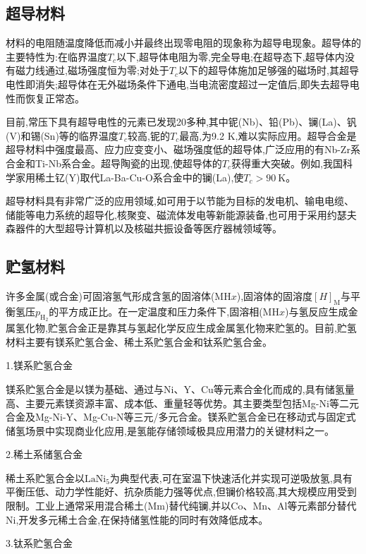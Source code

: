 \documentclass[UTF8]{ctexbook}
\newcommand{\◎}{\ensuremath{\bigcirc}}
\begin{document}
\subsection{超导材料}

材料的电阻随温度降低而减小并最终出现零电阻的现象称为超导电现象。超导体的主要特性为:在临界温度$T_c$以下,超导体电阻为零,完全导电;在超导态下,超导体内没有磁力线通过,磁场强度恒为零;对处于$T_c$以下的超导体施加足够强的磁场时,其超导电性即消失;超导体在无外磁场条件下通电,当电流密度超过一定值后,即失去超导电性而恢复正常态。

目前,常压下具有超导电性的元素已发现20多种,其中铌(Nb)、铅(Pb)、镧(La)、钒(V)和锡(Sn)等的临界温度$T_c$较高,铌的$T_c$最高,为9.2 K,难以实际应用。超导合金是超导材料中强度最高、应力应变变小、磁场强度低的超导体,广泛应用的有Nb-Zr系合金和Ti-Nb系合金。超导陶瓷的出现,使超导体的$T_c$获得重大突破。例如,我国科学家用稀土钇(Y)取代La-Ba-Cu-O系合金中的镧(La),使$T_c > 90~\mathrm{K}$。

超导材料具有非常广泛的应用领域,如可用于以节能为目标的发电机、输电电缆、储能等电力系统的超导化,核聚变、磁流体发电等新能源装备,也可用于采用约瑟夫森器件的大型超导计算机以及核磁共振设备等医疗器械领域等。

\subsection{贮氢材料}

许多金属(或合金)可固溶氢气形成含氢的固溶体($\mathrm{MH}x$),固溶体的固溶度$[H]_\mathrm{M}$与平衡氢压$p_{\mathrm{H_2}}$的平方成正比。在一定温度和压力条件下,固溶相($\mathrm{MH}x$)与氢反应生成金属氢化物,贮氢合金正是靠其与氢起化学反应生成金属氢化物来贮氢的。目前,贮氢材料主要有镁系贮氢合金、稀土系贮氢合金和钛系贮氢合金。

1.镁系贮氢合金

镁系贮氢合金是以镁为基础、通过与Ni、Y、Cu等元素合金化而成的,具有储氢量高、主要元素镁资源丰富、成本低、重量轻等优势。其主要类型包括Mg-Ni等二元合金及Mg-Ni-Y、Mg-Cu-N等三元/多元合金。镁系贮氢合金已在移动式与固定式储氢场景中实现商业化应用,是氢能存储领域极具应用潜力的关键材料之一。

2.稀土系储氢合金

稀土系贮氢合金以$\mathrm{LaNi_5}$为典型代表,可在室温下快速活化并实现可逆吸放氢,具有平衡压低、动力学性能好、抗杂质能力强等优点,但镧价格较高,其大规模应用受到限制。工业上通常采用混合稀土(Mm)替代纯镧,并以Co、Mn、Al等元素部分替代Ni,开发多元稀土合金,在保持储氢性能的同时有效降低成本。

3.钛系贮氢合金
\end{document}
